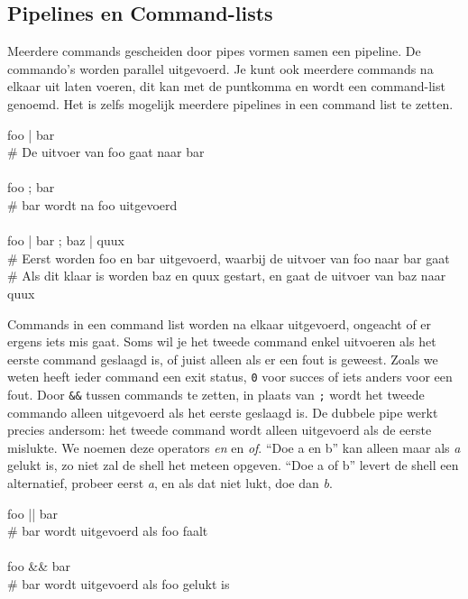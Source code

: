 \subsection{Pipelines en Command-lists}\label{pipelines-en-command-lists}

Meerdere commands gescheiden door pipes vormen samen een pipeline. De commando's worden parallel uitgevoerd. Je kunt ook meerdere commands na elkaar uit laten voeren, dit kan met de puntkomma en wordt een command-list genoemd. Het is zelfs mogelijk meerdere pipelines in een command list te zetten.

\begin{bash}
\userprompt[~] foo | bar\\
\# De uitvoer van foo gaat naar bar\\
\\
\userprompt[~] foo ; bar\\
\# bar wordt na foo uitgevoerd\\
\\
\userprompt[~] foo | bar ; baz | quux\\
\# Eerst worden foo en bar uitgevoerd, waarbij de uitvoer van foo naar bar gaat\\
\# Als dit klaar is worden baz en quux gestart, en gaat de uitvoer van baz naar quux\\
\end{bash}

Commands in een command list worden na elkaar uitgevoerd, ongeacht of er ergens iets mis gaat. Soms wil je het tweede command enkel uitvoeren als het eerste command geslaagd is, of juist alleen als er een fout is geweest. Zoals we weten heeft ieder command een exit status, \texttt{0} voor succes of iets anders voor een fout. Door \texttt{\&\&} tussen commands te zetten, in plaats van \texttt{;} wordt het tweede commando alleen uitgevoerd als het eerste geslaagd is. De dubbele pipe \texttt{\textbar{}\textbar{}} werkt precies andersom: het tweede command wordt alleen uitgevoerd als de eerste mislukte. We noemen deze operators \emph{en} en \emph{of}. ``Doe a en b'' kan alleen maar als \emph{a} gelukt is, zo niet zal de shell het meteen opgeven. ``Doe a of b'' levert de shell een alternatief, probeer eerst \emph{a}, en als dat niet lukt, doe dan \emph{b}.

\begin{bash}
\userprompt[~] foo || bar\\
\# bar wordt uitgevoerd als foo faalt\\
\\
\userprompt[~] foo && bar\\
\# bar wordt uitgevoerd als foo gelukt is\\
\end{bash}

